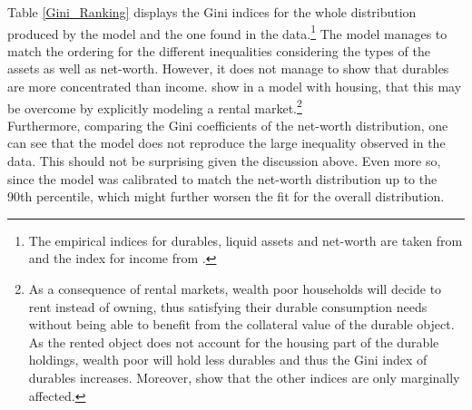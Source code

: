 \documentclass[a4paper,12pt,legno]{article}
\begin{document}
Table \ref{Gini_Ranking} displays the Gini indices for the whole distribution produced by the model and the one found in the data.\footnote{The empirical indices for durables, liquid assets and net-worth are taken from \cite{hintermaier2010} and the index for income from \cite{hintermaier2011}.} The model manages to match the ordering for the different inequalities considering the types of the assets as well as net-worth. However, it does not manage to show that durables are more concentrated than income. \cite{diaz2010} show in a model with housing, that this may be overcome by explicitly modeling a rental market.\footnote{As a consequence of rental markets, wealth poor households will decide to rent instead of owning, thus satisfying their durable consumption needs without being able to benefit from the collateral value of the durable object. As the rented object does not account for the housing part of the durable holdings, wealth poor will hold less durables and thus the Gini index of durables increases. Moreover, \cite{diaz2010} show that the other indices are only marginally affected.} \\
Furthermore, comparing the Gini coefficients of the net-worth distribution, one can see that the model does not reproduce the large inequality observed in the data. This should not be surprising given the discussion above. Even more so, since the model was calibrated to match the net-worth distribution up to the 90th percentile, which might further worsen the fit for the overall distribution.  
\end{document}
